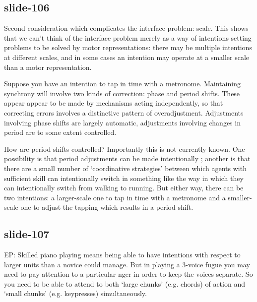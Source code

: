 \documentclass[12pt,\papersize]{extarticle}
\begin{document}
\subsection{slide-106}
Second consideration which complicates the interface problem: scale.
This shows that we can’t think of the interface problem merely as a way of intentions
setting problems to be solved by motor representations: there may be multiple intentions
at different scales, and in some cases an intention may operate at a smaller scale than
a motor representation.
 
Suppose you have an intention to tap in time with a metronome.
Maintaining synchrony will involve two kinds of correction: phase and period shifts.
These appear appear to be made by mechanisms acting independently, so that correcting errors involves a distinctive pattern of overadjustment.
Adjustments involving phase shifts are largely automatic, adjustments involving changes in period are to some extent controlled.
 
How are period shifts controlled?
Importantly this is not currently known.
One possibility is that period adjustments can be made intentionally \citep[as][p.~2599 hint]{fairhurst:2013_being};
another is that there are a small number of ‘coordinative strategies’ \citep{repp:2008_sensorimotor} between which agents with sufficient skill can intentionally switch in something like the way in which they can intentionally switch from walking to running.
But either way, there can be two intentions: a larger-scale one to tap in time with a metronome
and a smaller-scale one to adjust the tapping which results in a period shift.
 
\subsection{slide-107}
EP: Skilled piano playing means being able to have intentions with respect to larger units than a
novice could manage. But in playing a 3-voice fugue you may need to pay attention to a particular
nger in order to keep the voices separate. So you need to be able to attend to both ‘large chunks’
(e.g. chords) of action and ‘small chunks’ (e.g. keypresses) simultaneously.
 
\end{document}
